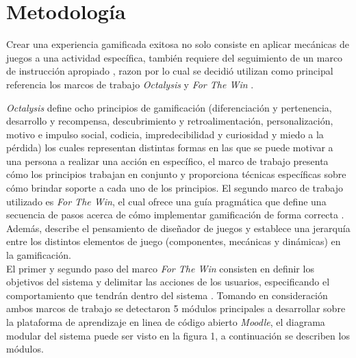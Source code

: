 
\section{Metodología}

    Crear una experiencia gamificada exitosa no solo consiste en aplicar mecánicas
    de juegos a una actividad específica, también requiere del seguimiento de un
    marco de instrucción apropiado \cite{GamInE-Learning}, razon por lo
    cual se decidió utilizan como principal referencia los marcos de trabajo
    {\it Octalysis} \cite{Octalysis} y {\it For The Win} \cite{ForTheWin}.\par
%
    \noindent 
    {\it Octalysis} define ocho principios de gamificación (diferenciación y
    pertenencia, desarrollo y recompensa, descubrimiento y retroalimentación,
    personalización, motivo e impulso social, codicia, impredecibilidad y curiosidad
    y miedo a la pérdida) los cuales representan distintas formas en las que se
    puede motivar a una persona a realizar una acción en específico, el marco de
    trabajo presenta cómo los principios trabajan en conjunto y proporciona técnicas
    específicas sobre cómo brindar soporte a cada uno de los principios.
%
    El segundo marco de trabajo utilizado es {\it For The Win}, el cual ofrece una
    guía pragmática que define una secuencia de pasos acerca de cómo implementar
    gamificación de forma correcta \cite{ForTheWin}. Además, describe el pensamiento
    de diseñador de juegos y establece una jerarquía entre los distintos elementos
    de juego (componentes, mecánicas y dinámicas) en la gamificación.\\
%
    El primer y segundo paso del marco {\it For The Win} consisten en definir
    los objetivos del sistema y delimitar las acciones de los usuarios, especificando
    el comportamiento que tendrán dentro del sistema \cite{ForTheWin}.
    Tomando en consideración ambos marcos de trabajo se detectaron 5 módulos
    principales a desarrollar sobre la plataforma de aprendizaje en linea de código
    abierto {\it Moodle}, el diagrama modular del sistema puede ser visto en la
    figura 1, a continuación se describen los módulos.\par
%
